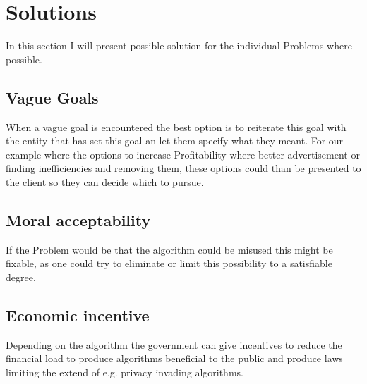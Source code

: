 \section{Solutions}
In this section I will present possible solution
for the individual Problems where possible.

\subsection{Vague Goals}
When a vague goal is encountered the best option is to reiterate this goal with the entity that has set this goal an let them specify what they meant. For our example where the options to increase Profitability where better advertisement or finding inefficiencies and removing them, these options could than be presented to the client so they can decide which to pursue.


\subsection{Moral acceptability}
If the Problem would be that the algorithm could be misused
this might be fixable, as one could try to eliminate or limit this possibility to a satisfiable degree.

\subsection{Economic incentive}
Depending on the algorithm the government can
give incentives to reduce the financial load
to produce algorithms beneficial to the public and
produce laws limiting the extend of e.g. privacy invading algorithms.









